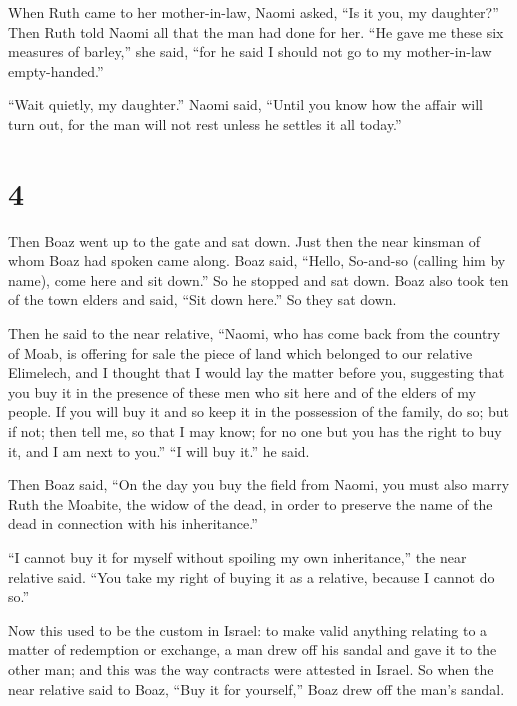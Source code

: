  When Ruth came to her mother-in-law, Naomi asked, ``Is it
you, my daughter?'' Then Ruth told Naomi all that the man had done for
her.  ``He gave me these six measures of barley,'' she
said, ``for he said I should not go to my mother-in-law empty-handed.''

 ``Wait quietly, my daughter.'' Naomi said, ``Until you
know how the affair will turn out, for the man will not rest unless he
settles it all today.''

\hypertarget{section-3}{%
\section{4}\label{section-3}}

 Then Boaz went up to the gate and sat down. Just then the
near kinsman of whom Boaz had spoken came along. Boaz said, ``Hello,
So-and-so (calling him by name), come here and sit down.'' So he stopped
and sat down.  Boaz also took ten of the town elders and
said, ``Sit down here.'' So they sat down.

 Then he said to the near relative, ``Naomi, who has come
back from the country of Moab, is offering for sale the piece of land
which belonged to our relative Elimelech,  and I thought
that I would lay the matter before you, suggesting that you buy it in
the presence of these men who sit here and of the elders of my people.
If you will buy it and so keep it in the possession of the family, do
so; but if not; then tell me, so that I may know; for no one but you has
the right to buy it, and I am next to you.'' ``I will buy it.'' he said.

 Then Boaz said, ``On the day you buy the field from Naomi,
you must also marry Ruth the Moabite, the widow of the dead, in order to
preserve the name of the dead in connection with his inheritance.''

 ``I cannot buy it for myself without spoiling my own
inheritance,'' the near relative said. ``You take my right of buying it
as a relative, because I cannot do so.''

 Now this used to be the custom in Israel: to make valid
anything relating to a matter of redemption or exchange, a man drew off
his sandal and gave it to the other man; and this was the way contracts
were attested in Israel.  So when the near relative said to
Boaz, ``Buy it for yourself,'' Boaz drew off the man's sandal.

